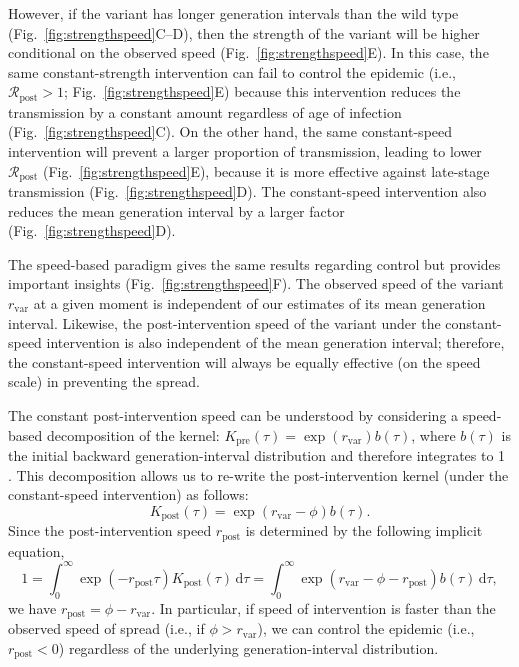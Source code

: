 \documentclass[12pt]{article}
\newcommand{\fref}[1]{Fig.~\ref{fig:#1}}
\newcommand{\vvvar}{\mathrm{var}}
\newcommand{\rx}[1]{\ensuremath{{r}_{#1}}\xspace}
\newcommand{\ry}[1]{\rx{\mathrm{#1}}}
\newcommand{\rv}{\rx{\vvvar}}
\newcommand{\Rx}[1]{\ensuremath{{\mathcal R}_{#1}}\xspace}
\newcommand{\Ry}[1]{\Rx{\mathrm{#1}}}
\newcommand{\dd}[1]{\ensuremath{\, \mathrm{d}#1}}
\newcommand{\dtau}{\dd{\tau}}
\begin{document}
However, if the variant has longer generation intervals than the wild type (\fref{strengthspeed}C--D),  then the strength of the variant will be higher conditional on the observed speed (\fref{strengthspeed}E).
In this case, the same constant-strength intervention can fail to control the epidemic (i.e., $\Ry{post} > 1$; \fref{strengthspeed}E) because this intervention reduces the transmission by a constant amount regardless of age of infection (\fref{strengthspeed}C).
On the other hand, the same constant-speed intervention will prevent a larger proportion of transmission, leading to lower $\Ry{post}$ (\fref{strengthspeed}E), because it is more effective against late-stage transmission (\fref{strengthspeed}D).
The constant-speed intervention also reduces the mean generation interval by a larger factor (\fref{strengthspeed}D).

The speed-based paradigm gives the same results regarding control but provides important insights (\fref{strengthspeed}F).
The observed speed of the variant $\rv$ at a given moment is independent of our estimates of its mean generation interval.
Likewise, the post-intervention speed of the variant under the constant-speed intervention is also independent of the mean generation interval;
therefore, the constant-speed intervention will always be equally effective (on the speed scale) in preventing the spread.

The constant post-intervention speed can be understood by considering a speed-based decomposition of the kernel: $K_{\mathrm{pre}}(\tau) = \exp(\rv) b(\tau)$, where $b(\tau)$ is the initial backward generation-interval distribution and therefore integrates to 1 \citep{doi:10.1098/rspb.2020.1556}.
This decomposition allows us to re-write the post-intervention kernel (under the constant-speed intervention) as follows:
\begin{equation}
K_{\mathrm{post}}(\tau) = \exp(\rv-\phi) b(\tau).
\end{equation}
Since the post-intervention speed $\ry{post}$ is determined by the following implicit equation,
\begin{equation}
1 = \int_0^\infty \exp(-\ry{post} \tau) K_{\mathrm{post}}(\tau) \dtau = \int_0^\infty \exp(\rv-\phi-\ry{post}) b(\tau)  \dtau,
\end{equation}
we have $\ry{post} = \phi - \rv$. 
In particular, if speed of intervention is faster than the observed speed of spread (i.e., if $\phi > \rv$), we can control the epidemic (i.e., $\ry{post} < 0$) regardless of the underlying generation-interval distribution.
\end{document}
